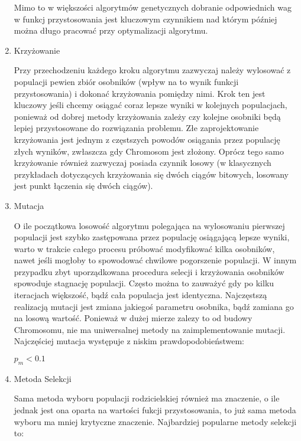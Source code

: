 \begin{par}
\begin{enumerate}
\begin{par}
		Mimo to w większości algorytmów genetycznych dobranie odpowiednich wag w funkcj przystosowania jest kluczowym czynnikiem nad którym później można długo pracować przy optymalizacji algorytmu.
	\end{par}
\item Krzyżowanie
	\begin{par}
		Przy przechodzeniu każdego kroku algorytmu zazwyczaj należy wylosować z populacji pewien zbiór osobników (wpływ na to wynik funkcji przystosowania) i dokonać krzyżowania pomiędzy nimi. 
		Krok ten jest kluczowy jeśli chcemy osiągać coraz lepsze wyniki w kolejnych populacjach, ponieważ od dobrej metody krzyżowania zależy czy kolejne osobniki będą lepiej przystosowane do rozwiązania problemu.
		Złe zaprojektowanie krzyżowania jest jednym z częstszych powodów osiągania przez populację złych wyników, zwłaszcza gdy Chromosom jest złożony.
		Oprócz tego samo krzyżowanie również zazwyczaj posiada czynnik losowy (w klasycznych przykładach dotyczących krzyżowania się dwóch ciągów bitowych, losowany jest punkt łączenia się dwóch ciągów).
	\end{par}
\item Mutacja
	\begin{par}
		O ile początkowa losowość algorytmu polegająca na wylosowaniu pierwszej populacji jest szybko zastępowana przez populację osiągającą lepsze wyniki, 
		warto w trakcie całego procesu próbować modyfikować kilka osobników, nawet jeśli mogłoby to spowodować chwilowe pogorszenie populacji. 
		W innym przypadku zbyt uporządkowana procedura selecji i krzyżowania osobników spowoduje stagnację populacji. 
		Często można to zauważyć gdy po kilku iteracjach większość, bądź cała populacja jest identyczna.
		Najczęstszą realizacją mutacji jest zmiana jakiegoś parametru osobnika, bądź zamiana go na losową wartość.
		Ponieważ w dużej mierze zalezy to od budowy Chromosomu, nie ma uniwersalnej metody na zaimplementowanie mutacji.
		Najczęściej mutacja występuje z niskim prawdopodobieństwem:
		\begin{center}
			$p_m < 0.1$
		\end{center}
	\end{par}
\item Metoda Selekcji
	\begin{par}
		Sama metoda wyboru populacji rodzicielskiej również ma znaczenie, o ile jednak jest ona oparta na wartości fukcji przystosowania, to już sama metoda wyboru ma mniej krytyczne znaczenie.
		Najbardziej popularne metody selekcji to:
		\begin{enumerate}

\end{enumerate}
\end{par}
\end{enumerate}
\end{par}
